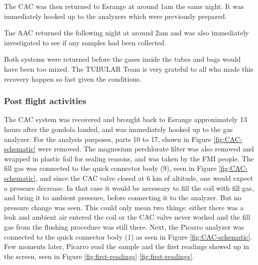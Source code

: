The CAC was then returned to Esrange at around 1am the same night. It was immediately hooked up to the analyzers which were previously prepared.

Tne AAC returned the following night at around 2am and was also immediately investigated to see if any samples had been collected.

Both systems were returned before the gases inside the tubes and bags would have been too mixed. The TUBULAR Team is very grateful to all who made this recovery happen so fast given the conditions.

\subsubsection{Post flight activities} \label{post_flight}


The CAC system was recovered and brought back to Esrange approximately 13 hours after the gondola landed, and was immediately hooked up to the gas analyzer. For the analysis purposes, parts 10 to 17, shown in Figure \ref{fig:CAC-schematic} were removed. The magnesium perchlorate filter was also removed and wrapped in plastic foil for sealing reasons, and was taken by the FMI people. The fill gas was connected to the quick connector body (9), seen in Figure \ref{fig:CAC-schematic}, and since the CAC valve closed at 6 km of altitude, one would expect a pressure decrease. In that case it would be necessary to fill the coil with fill gas, and bring it to ambient pressure, before connecting it to the analyzer. But no pressure change was seen. This could only mean two things: either there was a leak and ambient air entered the coil or the CAC valve never worked and the fill gas from the flushing procedure was still there. Next, the Picarro analyzer was connected to the quick connector body (1) as seen in Figure \ref{fig:CAC-schematic}. Few moments later, Picarro read the sample and the first readings showed up in the screen, seen in Figure \ref{fig:first-readings} \ref{fig:first-readings}.     

